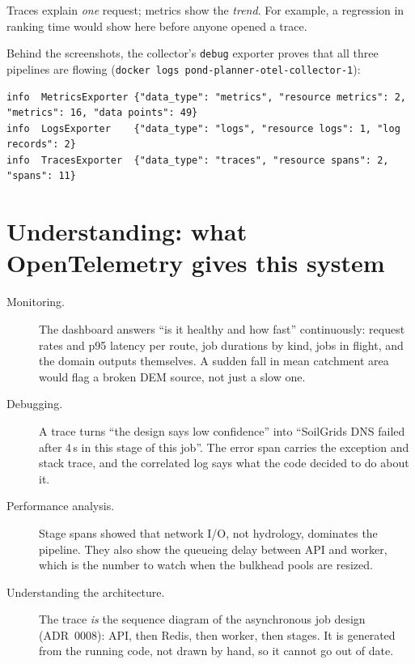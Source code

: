 \documentclass[manuscript,screen,review]{acmart}
\begin{document}
Traces explain \emph{one} request; metrics show the \emph{trend}. For example, a regression
in ranking time would show here before anyone opened a trace.

Behind the screenshots, the collector's \texttt{debug} exporter proves that all three
pipelines are flowing (\texttt{docker logs pond-planner-otel-collector-1}):
\begin{lstlisting}
info  MetricsExporter {"data_type": "metrics", "resource metrics": 2, "metrics": 16, "data points": 49}
info  LogsExporter    {"data_type": "logs", "resource logs": 1, "log records": 2}
info  TracesExporter  {"data_type": "traces", "resource spans": 2, "spans": 11}
\end{lstlisting}

\section{Understanding: what OpenTelemetry gives this system}
\begin{description}
  \item[Monitoring.] The dashboard answers ``is it healthy and how fast'' continuously:
    request rates and p95 latency per route, job durations by kind, jobs in flight, and the
    domain outputs themselves. A sudden fall in mean catchment area would flag a broken DEM
    source, not just a slow one.
  \item[Debugging.] A trace turns ``the design says low confidence'' into ``SoilGrids DNS
    failed after 4\,s in this stage of this job''. The error span carries the exception and
    stack trace, and the correlated log says what the code decided to do about it.
  \item[Performance analysis.] Stage spans showed that network I/O, not hydrology, dominates
    the pipeline. They also show the queueing delay between API and worker, which is the
    number to watch when the bulkhead pools are resized.
  \item[Understanding the architecture.] The trace \emph{is} the sequence diagram of the
    asynchronous job design (ADR~0008): API, then Redis, then worker, then stages. It is
    generated from the running code, not drawn by hand, so it cannot go out of date.
\end{description}
\end{document}
